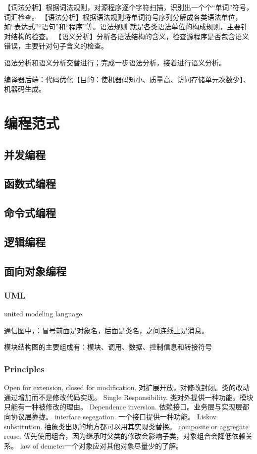 \documentclass[UTF8]{../computerUniverse}
\begin{document}
【词法分析】根据词法规则，对源程序逐个字符扫描，识别出一个个“单词”符号，词汇检查。
【语法分析】根据语法规则将单词符号序列分解成各类语法单位，如“表达式”“语句”和“程序”等。语法规则
就是各类语法单位的构成规则，主要针对结构的检查。
【语义分析】分析各语法结构的含义，检查源程序是否包含语义错误，主要针对句子含义的检查。


语法分析和语义分析交替进行；完成一步语法分析，接着进行语义分析。

编译器后端：代码优化【目的：使机器码短小、质量高、访问存储单元次数少】、机器码生成。

\chapter{编程范式}

\section{并发编程}
\section{函数式编程}
\section{命令式编程}
\section{逻辑编程}

\section{面向对象编程}
    
\subsection{UML}
united modeling language. 

通信图中，：冒号前面是对象名，后面是类名，之间连线上是消息。

模块结构图的主要组成有：模块、调用、数据、控制信息和转接符号

\subsection{Principles}
Open for extension, closed for modification. 对扩展开放，对修改封闭。类的改动通过增加而不是修改代码实现。
Single Responsibility. 类对外提供一种功能。模块只能有一种被修改的理由。
Dependence inversion. 依赖接口。业务层与实现层都向协议层靠拢。
interface segegation. 一个接口提供一种功能。
Liskov substitution. 抽象类出现的地方都可以用其实现类替换。
composite or aggregate reuse. 优先使用组合，因为继承时父类的修改会影响子类，对象组合会降低依赖关系。
law of demeter一个对象应对其他对象尽量少的了解。
\end{document}
